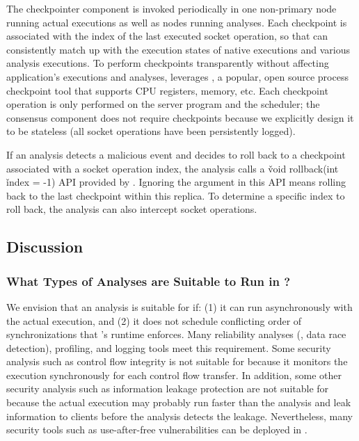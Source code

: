 The checkpointer component is invoked periodically in one non-primary node 
running actual executions as well as nodes running analyses. Each 
checkpoint is associated with the index of the last executed socket operation, 
so that \xxx can consistently match up with the execution states of native 
executions and various analysis executions. To perform checkpoints 
transparently without affecting application's executions and analyses, \xxx 
leverages \criu, a popular, open source process checkpoint tool that supports 
CPU registers, memory, etc. Each checkpoint operation is only performed on the 
server program and the \dmt scheduler; the \paxos consensus component does not 
require checkpoints because we explicitly design it to be stateless (all socket 
operations have been persistently logged).

If an analysis detects a malicious event and decides to roll back to a 
checkpoint associated with a socket operation index, the analysis calls a 
\v{void rollback(int} \v{index = -1)} API provided by \xxx. Ignoring the 
argument in this API means rolling back to the last checkpoint within this 
replica. To determine a specific index to roll back, the analysis can also 
intercept socket operations.



\subsection{Discussion} \label{sec:discuss}

\subsubsection{What Types of Analyses are Suitable to Run in \xxx?} 
\label{sec:analysis-types}

We envision that an analysis is suitable for \xxx if: (1) it can run 
asynchronously with the actual execution, and (2) it does not schedule 
conflicting order of \pthread synchronizations that \xxx's \dmt runtime 
enforces. Many reliability analyses (\eg, data race detection), profiling, 
and logging tools meet this requirement. Some security analysis such as control 
flow integrity is not suitable for \xxx because it monitors the execution 
synchronously for each control flow transfer. In addition, some other security 
analysis such as information leakage protection are not suitable for \xxx 
because the actual execution may probably run faster than the 
analysis and leak information to clients before the analysis detects the 
leakage. Nevertheless, many security tools such as use-after-free 
vulnerabilities can be deployed in \xxx.

